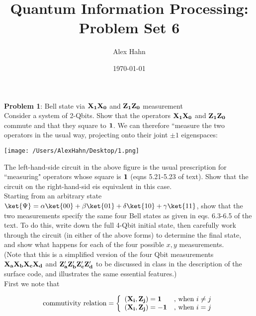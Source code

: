 

\title{Quantum Information Processing: Problem Set 6}
\author{Alex Hahn}
\date{\today}
\maketitle
\setlength{\parindent}{0pt}

\textbf{Problem 1}: Bell state via $\bf{X}_1\bf{X}_0$ and
$\bf{Z}_1\bf{Z}_0$ measurement\\

Consider a system of 2-Qbits. Show that the operators
$\bf{X}_1\bf{X}_0$ and $\bf{Z}_1\bf{Z}_0$ commute and that they square to
$\bf{1}$. We can therefore ``measure the two operators in the usual way,
projecting onto their joint $\pm1$ eigenspaces:

\begin{center}
\texttt{[image: /Users/AlexHahn/Desktop/1.png]}
\end{center}

The left-hand-side circuit in the above figure is the usual
prescription for ``measuring" operators whose square is $\bf{1}$ (eqns
5.21-5.23 of text). Show that the circuit on the right-hand-sid eis
equivalent in this case.\\

Starting from an arbitrary state
$\ket{\Psi}=\alpha\ket{00}+\beta\ket{01}+\delta\ket{10}+\gamma\ket{11}$,
show that the two measurements specify the same four Bell states as given in
eqs. 6.3-6.5 of the text. To
do this, write down the full 4-Qbit initial state, then carefully work through
the circuit (in either of the above forms) to determine the final state, and show what
happens for each of the four possible $x,y$ measurements.\\
(Note that this is a simplified version of the four Qbit measurements
$\bf{X}_a\bf{X}_b\bf{X}_c\bf{X}_d$ and $\bf{Z}_a'\bf{Z}_b'\bf{Z}_c'\bf{Z}_d'$ to be discussed in class in the description of the surface code, and illustrates the same essential features.)\\

First we note that

$$\text{commutivity relation}=\left\{\begin{array}{lr}
(\bf{X}_i,\bf{Z_j})=1 & \text{, when } i\not=j\\
(\bf{X}_i,\bf{Z_j})=-1 & \text{, when } i=j
\end{array}\right.$$

